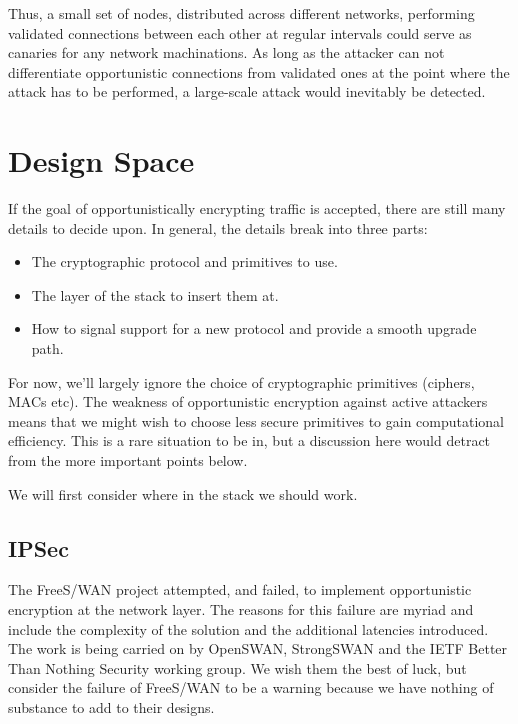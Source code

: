 \documentclass[conference]{IEEEtran}
\begin{document}
Thus, a small set of nodes, distributed across different networks, performing
validated connections between each other at regular intervals could serve as
canaries for any network machinations. As long as the attacker can not
differentiate opportunistic connections from validated ones at the point where
the attack has to be performed, a large-scale attack would inevitably be
detected.

\section{Design Space}

If the goal of opportunistically encrypting traffic is accepted, there are
still many details to decide upon. In general, the details break into three
parts:

\begin{itemize}
\item The cryptographic protocol and primitives to use.
\item The layer of the stack to insert them at.
\item How to signal support for a new protocol and provide a smooth upgrade path.
\end{itemize}

For now, we'll largely ignore the choice of cryptographic primitives (ciphers,
MACs etc). The weakness of opportunistic encryption against active attackers
means that we might wish to choose less secure primitives to gain computational
efficiency. This is a rare situation to be in, but a discussion here would
detract from the more important points below.

We will first consider where in the stack we should work.

\subsection{IPSec}

The FreeS/WAN project\cite{freeswan} attempted, and
failed\cite{freeswanfailure}, to implement
opportunistic encryption at the network layer. The reasons for this failure are
myriad and include the complexity of the solution and the additional latencies
introduced. The work is being carried on by OpenSWAN, StrongSWAN and the IETF
Better Than Nothing Security working group\cite{btns}. We wish them the best of
luck, but consider the failure of FreeS/WAN to be a warning because we have
nothing of substance to add to their designs.
\end{document}

